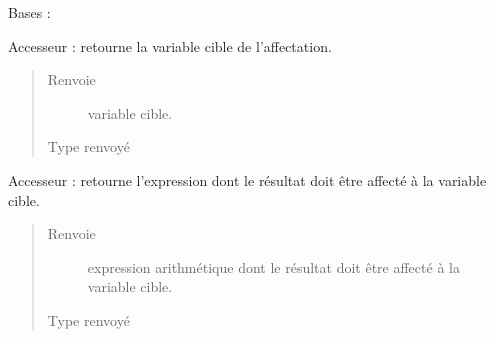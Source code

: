 \documentclass[letterpaper,10pt,french]{sphinxmanual}
\begin{document}
\begin{fulllineitems}
\label{\detokenize{structuresnodes:structuresnodes.AffectationNode}}
Bases : {\hyperref[\detokenize{structuresnodes:structuresnodes.StructureNode}]{}}

\begin{fulllineitems}
\label{\detokenize{structuresnodes:structuresnodes.AffectationNode.cible}}
Accesseur : retourne la variable cible de l’affectation.
\begin{quote}\begin{description}
\item[{Renvoie}] \leavevmode
variable cible.

\item[{Type renvoyé}] \leavevmode
{\hyperref[\detokenize{variable:variable.Variable}]{}}

\end{description}\end{quote}

\end{fulllineitems}


\begin{fulllineitems}
\label{\detokenize{structuresnodes:structuresnodes.AffectationNode.expression}}
Accesseur : retourne l’expression dont le résultat doit être affecté à la variable cible.
\begin{quote}\begin{description}
\item[{Renvoie}] \leavevmode
expression arithmétique dont le résultat doit être affecté à la variable cible.

\item[{Type renvoyé}] \leavevmode
{\hyperref[\detokenize{arithmeticexpressionnodes:arithmeticexpressionnodes.ArithmeticExpressionNode}]{}}

\end{description}\end{quote}

\end{fulllineitems}


\end{fulllineitems}
\end{document}
